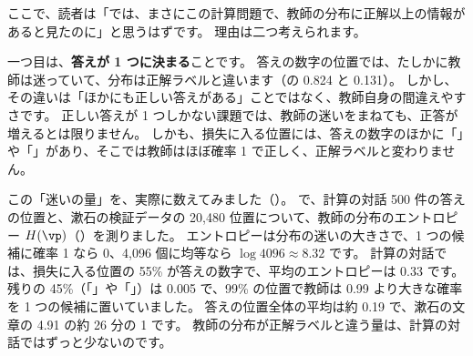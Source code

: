 ここで、読者は「では、まさにこの計算問題で、教師の分布に正解以上の情報があると見たのに」と思うはずです。
理由は二つ考えられます。

一つ目は、\textbf{答えが 1 つに決まる}ことです。
答えの数字の位置では、たしかに教師は迷っていて、分布は正解ラベルと違います（の 0.824 と 0.131）。
しかし、その違いは「ほかにも正しい答えがある」ことではなく、教師自身の間違えやすさです。
正しい答えが 1 つしかない課題では、教師の迷いをまねても、正答が増えるとは限りません。
しかも、損失に入る位置には、答えの数字のほかに「」や「」があり、そこでは教師はほぼ確率 1 で正しく、正解ラベルと変わりません。

この「迷いの量」を、実際に数えてみました（）。
 で、計算の対話 500 件の答えの位置と、漱石の検証データの 20,480 位置について、教師の分布のエントロピー $H(\vp)$（）を測りました。
エントロピーは分布の迷いの大きさで、1 つの候補に確率 1 なら 0、4,096 個に均等なら $\log4096\approx8.32$ です。
計算の対話では、損失に入る位置の 55\% が答えの数字で、平均のエントロピーは 0.33 です。
残りの 45\%（「」や「」）は 0.005 で、99\% の位置で教師は 0.99 より大きな確率を 1 つの候補に置いていました。
答えの位置全体の平均は約 0.19 で、漱石の文章の 4.91 の約 26 分の 1 です。
教師の分布が正解ラベルと違う量は、計算の対話ではずっと少ないのです。

